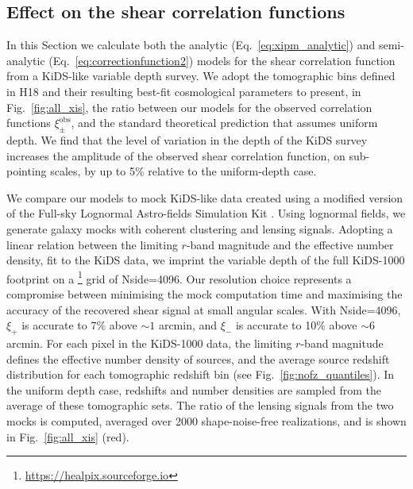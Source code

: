 \documentclass{aa}
\renewcommand{\rm}{\mathrm}
\begin{document}
\subsection{Effect on the shear correlation functions}

In this Section we calculate both the analytic (Eq.~\ref{eq:xipm_analytic}) and semi-analytic (Eq.~\ref{eq:correctionfunction2}) models for the shear correlation function from a KiDS-like variable depth survey.   We adopt the tomographic bins defined in H18 and their resulting best-fit cosmological parameters to present, in Fig.~\ref{fig:all_xis}, the ratio between our models for the observed correlation functions $\xi_\pm^{\rm{obs}}$, and the standard theoretical prediction that assumes uniform depth. We find that the level of variation in the depth of the KiDS survey increases the amplitude of the observed shear correlation function, on sub-pointing scales, by up to 5\% relative to the uniform-depth case.

We compare our models to mock KiDS-like data created using a modified version of the Full-sky Lognormal Astro-fields Simulation Kit \citep[,][Joachimi, Lin, et al. in prep.]{Xavier:2016}.  Using {} lognormal fields, we generate galaxy mocks with coherent clustering and lensing signals.   Adopting a linear relation between the limiting $r$-band magnitude and the effective number density, fit to the KiDS data, we imprint the variable depth of the full KiDS-1000 footprint \citep{Kuijken:2019} on a {}\footnote{\url{https://healpix.sourceforge.io}} grid of Nside=4096.  Our resolution choice represents a compromise between minimising the mock computation time and maximising the accuracy of the recovered shear signal at small angular scales. With Nside=4096, $\xi_+$ is accurate to 7\% above $\sim 1$ arcmin, and $\xi_-$ is accurate to 10\% above $\sim6$ arcmin.   For each {} pixel in the KiDS-1000 data, the limiting $r$-band magnitude defines the effective number density of sources, and the average source redshift distribution for each tomographic redshift bin (see Fig.~\ref{fig:nofz_quantiles}).  In the uniform depth case, redshifts and number densities are sampled from the average of these tomographic sets.  The ratio of the lensing signals from the two mocks is computed, averaged over 2000 shape-noise-free realizations, and is shown in Fig.~\ref{fig:all_xis} (red).
\end{document}
